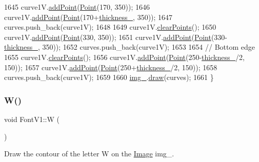 \begin{DoxyCode}
1645     curve1V.\mbox{\hyperlink{class_bezier_curve_a38d16c18b36ae45619b05e26e226cf34}{addPoint}}(\mbox{\hyperlink{class_point}{Point}}(170, 350));
1646     curve1V.\mbox{\hyperlink{class_bezier_curve_a38d16c18b36ae45619b05e26e226cf34}{addPoint}}(\mbox{\hyperlink{class_point}{Point}}(170+\mbox{\hyperlink{class_font_v1_aed8040e76be9a52833627b92f0fb4e5f}{thickness\_}}, 350));
1647     curves.push\_back(curve1V);
1648 
1649     curve1V.\mbox{\hyperlink{class_bezier_curve_a0ba8ce66d5af5971ae6a1b506029728e}{clearPoints}}();
1650     curve1V.\mbox{\hyperlink{class_bezier_curve_a38d16c18b36ae45619b05e26e226cf34}{addPoint}}(\mbox{\hyperlink{class_point}{Point}}(330, 350));
1651     curve1V.\mbox{\hyperlink{class_bezier_curve_a38d16c18b36ae45619b05e26e226cf34}{addPoint}}(\mbox{\hyperlink{class_point}{Point}}(330-\mbox{\hyperlink{class_font_v1_aed8040e76be9a52833627b92f0fb4e5f}{thickness\_}}, 350));
1652     curves.push\_back(curve1V);
1653 
1654     \textcolor{comment}{// Bottom edge}
1655     curve1V.\mbox{\hyperlink{class_bezier_curve_a0ba8ce66d5af5971ae6a1b506029728e}{clearPoints}}();
1656     curve1V.\mbox{\hyperlink{class_bezier_curve_a38d16c18b36ae45619b05e26e226cf34}{addPoint}}(\mbox{\hyperlink{class_point}{Point}}(250-\mbox{\hyperlink{class_font_v1_aed8040e76be9a52833627b92f0fb4e5f}{thickness\_}}/2, 150));
1657     curve1V.\mbox{\hyperlink{class_bezier_curve_a38d16c18b36ae45619b05e26e226cf34}{addPoint}}(\mbox{\hyperlink{class_point}{Point}}(250+\mbox{\hyperlink{class_font_v1_aed8040e76be9a52833627b92f0fb4e5f}{thickness\_}}/2, 150));
1658     curves.push\_back(curve1V);
1659 
1660     \mbox{\hyperlink{class_font_v1_a00569e3e3c4b70f437b63f396f735fb0}{img\_}}.\mbox{\hyperlink{class_image_a8d162f3cab956131d58708c09aa560b0}{draw}}(curves);
1661 \}
\end{DoxyCode}
\mbox{\label{class_font_v1_aa4e67840b676dfffd3e03d873013174c}} 
\subsubsection{\texorpdfstring{W()}{W()}}
{\footnotesize\ttfamily void Font\+V1\+::W (\begin{DoxyParamCaption}{ }\end{DoxyParamCaption})}



Draw the contour of the letter W on the \mbox{\hyperlink{class_image}{Image}} img\+\_\+. 


